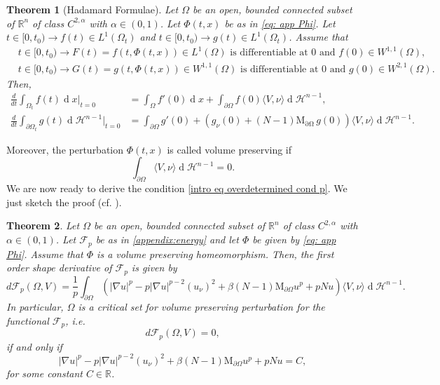 \documentclass[10pt,a4paper, reqno]{amsart}
\numberwithin{equation}{section}
\newcommand{\R}{\mathbb{R}}
\newtheorem{teo}{Theorem}[section]
\renewcommand{\d}[1]{\ensuremath{\operatorname{d}\!{#1}}}
\begin{document}
\begin{teo}[Hadamard Formulae]\label{thm hadamard}
    Let $\Omega$ be an open, bounded connected subset of $\R^n$ of class $C^{2,\alpha}$ with $\alpha \in (0,1)$. Let $\Phi(t,x)$ be as in \eqref{eq: app Phi}. Let $t \in [0,t_0) \to f(t) \in L^1(\Omega_t)$ and $t \in [0,t_0) \to g(t) \in L^1(\Omega_t)$. Assume that 
    \begin{equation*}
    \begin{split}
    &t \in [0,t_0) \to F(t) = f(t, \Phi(t,x)) \in L^1(\Omega) \text{ is differentiable at $0$ and } f(0) \in W^{1,1}(\Omega),
    \\
    &t \in [0,t_0) \to G(t) = g(t, \Phi(t,x)) \in W^{1,1}(\Omega) \text{ is differentiable at $0$ and } g(0) \in W^{2,1}(\Omega).
    \end{split}
    \end{equation*}
    Then,
    \begin{align}
        \frac{d}{dt}\int_{\Omega_t}f(t)\d{x}\bigg\rvert_{t=0}&=\int_\Omega f'(0)\d{x}+\int_{\partial\Omega}f(0)\langle V,\nu\rangle\d{}\mathcal{H}^{n-1},\label{hadamard-interior}\\
        \frac{d}{dt}\int_{\partial\Omega_t}g(t)\d{}\mathcal{H}^{n-1}\bigg\rvert_{t=0}&=\int_{\partial\Omega}g'(0)+\left(g_\nu(0)+(N-1)\mathrm{M_{\partial\Omega}} \,g(0)\right)\langle V,\nu\rangle\d{}\mathcal{H}^{n-1}.\label{hadamard-boundary}
    \end{align}
\end{teo}
Moreover, the perturbation $\Phi(t,x)$ is called volume preserving if
\begin{equation}\label{eq app volume preserving}
    \int_{\partial\Omega}\langle V,\nu\rangle\d{}\mathcal{H}^{n-1}=0.
\end{equation}
We are now ready to derive the condition \eqref{intro eq overdetermined cond p}. We just sketch the proof (cf. \cite[Thm. 4.1]{bw}).
\begin{teo}
    Let $\Omega$ be an open, bounded connected subset of $\R^n$ of class $C^{2,\alpha}$ with $\alpha \in (0,1)$. Let $\mathcal{F}_p$ be as in \eqref{appendix:energy} and let $\Phi$ be given by \eqref{eq: app Phi}. Assume that $\Phi$ is a volume preserving homeomorphism. Then, the first order shape derivative of $\mathcal{F}_p$ is given by
    \begin{equation*}
        d\mathcal{F}_p(\Omega,V)=\frac{1}{p}\int_{\partial\Omega}\left(|\nabla u|^p-p|\nabla u|^{p-2}(u_\nu)^2+\beta(N-1)\mathrm{M}_{\partial\Omega}u^p+pNu\right)\langle V,\nu\rangle\d{}\mathcal{H}^{n-1}.
    \end{equation*}
    In particular, $\Omega$ is a critical set for volume preserving perturbation for the functional $\mathcal{F}_p$, i.e. 
    \[
    d\mathcal{F}_p(\Omega,V)=0,
    \]
    if and only if
    \begin{equation}\label{eq app overdetermined}
    |\nabla u|^p-p|\nabla u|^{p-2}(u_\nu)^2+\beta(N-1)\mathrm{M}_{\partial\Omega}u^p+pNu=C,
    \end{equation}
    for some constant $C\in\R$.

\end{teo}
\end{document}
